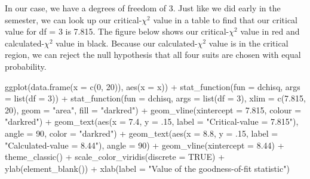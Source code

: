 \documentclass[
]{book}
\newenvironment{Shaded}{\begin{snugshade}}{\end{snugshade}}
\newcommand{\AttributeTok}[1]{\textcolor[rgb]{0.77,0.63,0.00}{#1}}
\newcommand{\ConstantTok}[1]{\textcolor[rgb]{0.00,0.00,0.00}{#1}}
\newcommand{\DecValTok}[1]{\textcolor[rgb]{0.00,0.00,0.81}{#1}}
\newcommand{\FloatTok}[1]{\textcolor[rgb]{0.00,0.00,0.81}{#1}}
\newcommand{\FunctionTok}[1]{\textcolor[rgb]{0.00,0.00,0.00}{#1}}
\newcommand{\NormalTok}[1]{#1}
\newcommand{\SpecialCharTok}[1]{\textcolor[rgb]{0.00,0.00,0.00}{#1}}
\newcommand{\StringTok}[1]{\textcolor[rgb]{0.31,0.60,0.02}{#1}}
\begin{document}
In our case, we have a degrees of freedom of 3. Just like we did early in the semester, we can look up our critical-\(\chi^2\) value in a table to find that our critical value for df = 3 is 7.815. The figure below shows our critical-\(\chi^2\) value in red and calculated-\(\chi^2\) value in black. Because our calculated-\(\chi^2\) value is in the critical region, we can reject the null hypothesis that all four suits are chosen with equal probability.

\begin{Shaded}
\begin{Highlighting}[]
\FunctionTok{ggplot}\NormalTok{(}\FunctionTok{data.frame}\NormalTok{(}\AttributeTok{x =} \FunctionTok{c}\NormalTok{(}\DecValTok{0}\NormalTok{, }\DecValTok{20}\NormalTok{)), }\FunctionTok{aes}\NormalTok{(}\AttributeTok{x =}\NormalTok{ x)) }\SpecialCharTok{+}
  \FunctionTok{stat\_function}\NormalTok{(}\AttributeTok{fun =}\NormalTok{ dchisq, }\AttributeTok{args =} \FunctionTok{list}\NormalTok{(}\AttributeTok{df =} \DecValTok{3}\NormalTok{)) }\SpecialCharTok{+}
  \FunctionTok{stat\_function}\NormalTok{(}\AttributeTok{fun =}\NormalTok{ dchisq, }\AttributeTok{args =} \FunctionTok{list}\NormalTok{(}\AttributeTok{df =} \DecValTok{3}\NormalTok{), }
                \AttributeTok{xlim =} \FunctionTok{c}\NormalTok{(}\FloatTok{7.815}\NormalTok{, }\DecValTok{20}\NormalTok{), }\AttributeTok{geom =} \StringTok{"area"}\NormalTok{, }\AttributeTok{fill =} \StringTok{"darkred"}\NormalTok{) }\SpecialCharTok{+}
  \FunctionTok{geom\_vline}\NormalTok{(}\AttributeTok{xintercept =} \FloatTok{7.815}\NormalTok{, }\AttributeTok{colour =} \StringTok{"darkred"}\NormalTok{) }\SpecialCharTok{+} 
  \FunctionTok{geom\_text}\NormalTok{(}\FunctionTok{aes}\NormalTok{(}\AttributeTok{x =} \FloatTok{7.4}\NormalTok{, }\AttributeTok{y =}\NormalTok{ .}\DecValTok{15}\NormalTok{, }\AttributeTok{label =} \StringTok{"Critical{-}value = 7.815"}\NormalTok{), }
            \AttributeTok{angle =} \DecValTok{90}\NormalTok{, }\AttributeTok{color =} \StringTok{"darkred"}\NormalTok{) }\SpecialCharTok{+}
  \FunctionTok{geom\_text}\NormalTok{(}\FunctionTok{aes}\NormalTok{(}\AttributeTok{x =} \FloatTok{8.8}\NormalTok{, }\AttributeTok{y =}\NormalTok{ .}\DecValTok{15}\NormalTok{, }\AttributeTok{label =} \StringTok{"Calculated{-}value = 8.44"}\NormalTok{), }
            \AttributeTok{angle =} \DecValTok{90}\NormalTok{) }\SpecialCharTok{+}
  \FunctionTok{geom\_vline}\NormalTok{(}\AttributeTok{xintercept =} \FloatTok{8.44}\NormalTok{) }\SpecialCharTok{+} 
  \FunctionTok{theme\_classic}\NormalTok{() }\SpecialCharTok{+}
  \FunctionTok{scale\_color\_viridis}\NormalTok{(}\AttributeTok{discrete =} \ConstantTok{TRUE}\NormalTok{) }\SpecialCharTok{+}
  \FunctionTok{ylab}\NormalTok{(}\FunctionTok{element\_blank}\NormalTok{()) }\SpecialCharTok{+}
  \FunctionTok{xlab}\NormalTok{(}\AttributeTok{label =} \StringTok{"Value of the goodness{-}of{-}fit statistic"}\NormalTok{)}
\end{Highlighting}
\end{Shaded}
\end{document}
